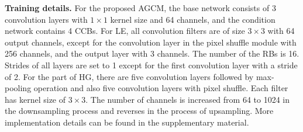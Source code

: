 \documentclass[10pt,twocolumn,letterpaper]{article}
\begin{document}
\textbf{Training details.} For the proposed AGCM, the base network consists of 3 convolution layers with $1\times 1$ kernel size and 64 channels, and the condition network contains 4 CCBs. For LE, all convolution filters are of size $3\times 3$ with 64 output channels, except for the convolution layer in the pixel shuffle module\cite{shi2016real} with 256 channels, and the output layer with 3 channels. The number of the RBs is 16. Strides of all layers are set to 1 except for the first convolution layer with a stride of 2. For the part of HG, there are five convolution layers followed by max-pooling operation and also five convolution layers with pixel shuffle. Each filter has kernel size of $3\times 3$. The number of channels is increased from 64 to 1024 in the downsampling process and reverses in the process of upsampling. More implementation details can be found in the supplementary material. 
\end{document}
